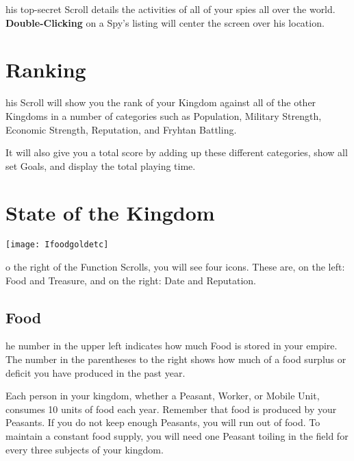 {his top-secret Scroll details the activities of all of your spies all over the world. \textbf{Double-Clicking} on a Spy’s listing will center the screen over his location.

\section{\textsf{Ranking}}


his Scroll will show you the rank of your Kingdom against all of the other Kingdoms in a number of categories such as Population, Military Strength, Economic Strength, Reputation, and Fryhtan Battling.

It will also give you a total score by adding up these different categories, show all set Goals, and display the total playing time.

\section{\textsf{State of the Kingdom}}


\begin{center}
    \texttt{[image: Ifoodgoldetc]} %
\end{center}

o the right of the Function Scrolls, you will see four icons. These are, on the left: Food and Treasure, and on the right: Date and Reputation.

\subsection{\textsf{Food}}


he number in the upper left indicates how much Food is stored in your empire. The number in the parentheses to the right shows how much of a food surplus or deficit you have produced in the past year.

Each person in your kingdom, whether a Peasant, Worker, or Mobile Unit, consumes 10 units of food each year. Remember that food is produced by your Peasants. If you do not keep enough Peasants, you will run out of food. To maintain a constant food supply, you will need one Peasant toiling in the field for every three subjects of your kingdom.

}
